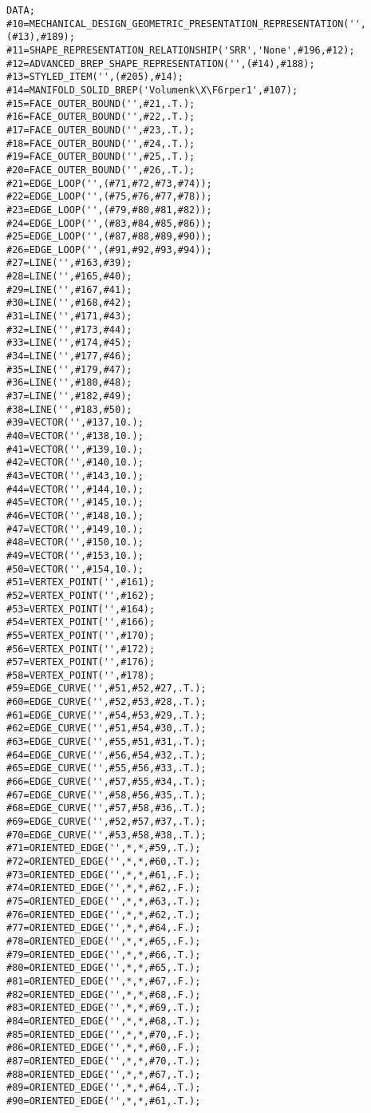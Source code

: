 \begin{lstlisting}[captionpos=b, style=customc, caption=Beschreibung eines Quaders in STEP, label=lis:simplestpanh]
DATA;
#10=MECHANICAL_DESIGN_GEOMETRIC_PRESENTATION_REPRESENTATION('',(#13),#189);
#11=SHAPE_REPRESENTATION_RELATIONSHIP('SRR','None',#196,#12);
#12=ADVANCED_BREP_SHAPE_REPRESENTATION('',(#14),#188);
#13=STYLED_ITEM('',(#205),#14);
#14=MANIFOLD_SOLID_BREP('Volumenk\X\F6rper1',#107);
#15=FACE_OUTER_BOUND('',#21,.T.);
#16=FACE_OUTER_BOUND('',#22,.T.);
#17=FACE_OUTER_BOUND('',#23,.T.);
#18=FACE_OUTER_BOUND('',#24,.T.);
#19=FACE_OUTER_BOUND('',#25,.T.);
#20=FACE_OUTER_BOUND('',#26,.T.);
#21=EDGE_LOOP('',(#71,#72,#73,#74));
#22=EDGE_LOOP('',(#75,#76,#77,#78));
#23=EDGE_LOOP('',(#79,#80,#81,#82));
#24=EDGE_LOOP('',(#83,#84,#85,#86));
#25=EDGE_LOOP('',(#87,#88,#89,#90));
#26=EDGE_LOOP('',(#91,#92,#93,#94));
#27=LINE('',#163,#39);
#28=LINE('',#165,#40);
#29=LINE('',#167,#41);
#30=LINE('',#168,#42);
#31=LINE('',#171,#43);
#32=LINE('',#173,#44);
#33=LINE('',#174,#45);
#34=LINE('',#177,#46);
#35=LINE('',#179,#47);
#36=LINE('',#180,#48);
#37=LINE('',#182,#49);
#38=LINE('',#183,#50);
#39=VECTOR('',#137,10.);
#40=VECTOR('',#138,10.);
#41=VECTOR('',#139,10.);
#42=VECTOR('',#140,10.);
#43=VECTOR('',#143,10.);
#44=VECTOR('',#144,10.);
#45=VECTOR('',#145,10.);
#46=VECTOR('',#148,10.);
#47=VECTOR('',#149,10.);
#48=VECTOR('',#150,10.);
#49=VECTOR('',#153,10.);
#50=VECTOR('',#154,10.);
#51=VERTEX_POINT('',#161);
#52=VERTEX_POINT('',#162);
#53=VERTEX_POINT('',#164);
#54=VERTEX_POINT('',#166);
#55=VERTEX_POINT('',#170);
#56=VERTEX_POINT('',#172);
#57=VERTEX_POINT('',#176);
#58=VERTEX_POINT('',#178);
#59=EDGE_CURVE('',#51,#52,#27,.T.);
#60=EDGE_CURVE('',#52,#53,#28,.T.);
#61=EDGE_CURVE('',#54,#53,#29,.T.);
#62=EDGE_CURVE('',#51,#54,#30,.T.);
#63=EDGE_CURVE('',#55,#51,#31,.T.);
#64=EDGE_CURVE('',#56,#54,#32,.T.);
#65=EDGE_CURVE('',#55,#56,#33,.T.);
#66=EDGE_CURVE('',#57,#55,#34,.T.);
#67=EDGE_CURVE('',#58,#56,#35,.T.);
#68=EDGE_CURVE('',#57,#58,#36,.T.);
#69=EDGE_CURVE('',#52,#57,#37,.T.);
#70=EDGE_CURVE('',#53,#58,#38,.T.);
#71=ORIENTED_EDGE('',*,*,#59,.T.);
#72=ORIENTED_EDGE('',*,*,#60,.T.);
#73=ORIENTED_EDGE('',*,*,#61,.F.);
#74=ORIENTED_EDGE('',*,*,#62,.F.);
#75=ORIENTED_EDGE('',*,*,#63,.T.);
#76=ORIENTED_EDGE('',*,*,#62,.T.);
#77=ORIENTED_EDGE('',*,*,#64,.F.);
#78=ORIENTED_EDGE('',*,*,#65,.F.);
#79=ORIENTED_EDGE('',*,*,#66,.T.);
#80=ORIENTED_EDGE('',*,*,#65,.T.);
#81=ORIENTED_EDGE('',*,*,#67,.F.);
#82=ORIENTED_EDGE('',*,*,#68,.F.);
#83=ORIENTED_EDGE('',*,*,#69,.T.);
#84=ORIENTED_EDGE('',*,*,#68,.T.);
#85=ORIENTED_EDGE('',*,*,#70,.F.);
#86=ORIENTED_EDGE('',*,*,#60,.F.);
#87=ORIENTED_EDGE('',*,*,#70,.T.);
#88=ORIENTED_EDGE('',*,*,#67,.T.);
#89=ORIENTED_EDGE('',*,*,#64,.T.);
#90=ORIENTED_EDGE('',*,*,#61,.T.);

\end{lstlisting}

